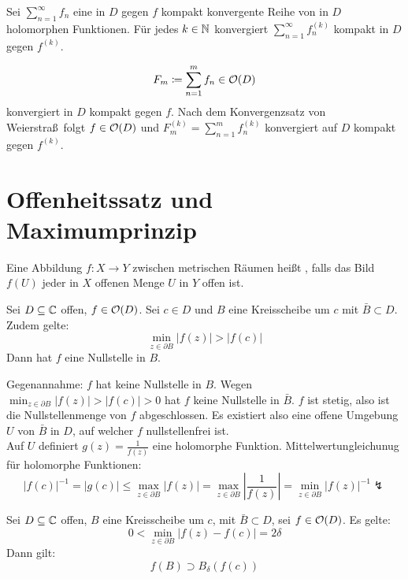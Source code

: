 \begin{satz}
	Sei $ \sum_{n=1}^\infty f_n $ eine in $ D $ gegen $ f $ kompakt konvergente Reihe von in $ D $ holomorphen Funktionen. F\"ur jedes $ k\in\mathbb{N} $ konvergiert $ \sum_{n=1}^\infty f_n^{(k)} $ kompakt in $ D $ gegen $ f^{(k)} $. 
\end{satz}
\begin{beweis}
	\[ F_m\coloneqq\sum_{n=1}^m f_n\in\mathcal O(D) \]
	konvergiert in $ D $ kompakt gegen $ f $. Nach dem Konvergenzsatz von Weierstra\ss\ folgt $ f\in\mathcal O(D) $ und $ F_m^{(k)}=\sum_{n=1}^m f_n^{(k)} $ konvergiert auf $ D $ kompakt gegen $ f^{(k)} $.
\end{beweis}
\newpage
\section{Offenheitssatz und Maximumprinzip}
\begin{definition}
	Eine Abbildung $ f\colon X\rightarrow Y $ zwischen metrischen R\"aumen hei\ss t , falls das Bild $ f(U) $ jeder in $ X $ offenen Menge $ U $ in $ Y $ offen ist. 
\end{definition}
\begin{lemma}
	Sei $ D\subseteq\mathbb{C} $ offen, $ f\in\mathcal O(D) $. Sei $ c\in D $ und $ B $ eine Kreisscheibe um $ c $ mit $ \bar B\subset D $. Zudem gelte:
	\[ \min_{z\in\partial B}|f(z)|>|f(c)| \]
	Dann hat $ f $ eine Nullstelle in $ B $.
\end{lemma} 
\begin{beweis}
	Gegenannahme: $ f $ hat keine Nullstelle in $ B $. Wegen $ \min_{z\in\partial B}|f(z)|>|f(c)|>0 $ hat $ f $ keine Nullstelle in $ \bar B $. $ f $ ist stetig, also ist die Nullstellenmenge von $ f $ abgeschlossen. Es existiert also eine offene Umgebung $ U $ von $ \bar B $ in $ D $, auf welcher $ f $ nullstellenfrei ist.\\
	Auf $ U $ definiert $ g(z)=\frac{1}{f(z)} $ eine holomorphe Funktion. Mittelwertungleichunug f\"ur holomorphe Funktionen:
	\[ |f(c)|^{-1}=|g(c)|\leq\max_{z\in\partial B}|f(z)|=\max_{z\in\partial B}\left|\frac{1}{f(z)}\right|=\min_{z\in\partial B}|f(z)|^{-1}\lightning \]
\end{beweis}
\begin{lemma}
	Sei $ D\subseteq \mathbb{C} $ offen, $ B $ eine Kreisscheibe um $ c $, mit $ \bar B\subset D $, sei $ f\in\mathcal O(D) $. Es gelte:
	\[ 0<\min_{z\in\partial B}|f(z)-f(c)|=2\delta \]
	Dann gilt: \[ f(B)\supset B_\delta(f(c)) \]
\end{lemma}
